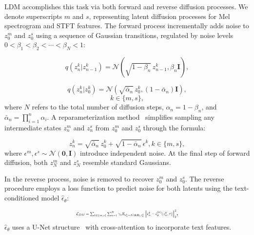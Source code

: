 \documentclass{IEEEtran}
\begin{document}
LDM accomplishes this task via both forward and reverse diffusion processes. We denote superscripts $m$ and $s$, representing latent diffusion processes for Mel spectrogram and STFT features. The forward process incrementally adds noise to $z^{m}_{0}$ and $z^{s}_{0}$ using a sequence of Gaussian transitions, regulated by noise levels $0 < \beta_{1} < \beta_{2} < \cdots < \beta_{N} < 1$:

\begin{equation}
q(z^{k}_{n} | z^{k}_{n-1}) = \mathcal{N}\left(\sqrt{1-\beta_{n}} \, z^{k}_{n-1}, \beta_{n} \mathbf{I}\right),
\end{equation}
\vspace{-0.5em}

\begin{equation}
q(z^{k}_{n} | z^{k}_{0}) = \mathcal{N}\left(\sqrt{\bar{\alpha}_{n}} \, z^{k}_{0}, (1-\bar{\alpha}_{n}) \mathbf{I}\right),
\end{equation}
\vspace{-0.5em}
\[
k \in \{m,s\},
\]
where \( N \) refers to the total number of diffusion steps, \( \alpha_{n} = 1 - \beta_{n} \), and \( \bar{\alpha}_{n} = \prod_{i=1}^{n} \alpha_{i} \). A reparameterization method~\cite{song2020denoising} simplifies sampling any intermediate states \( z^{m}_{n} \) and \( z^{s}_{n} \) from \( z^{m}_{0} \) and \( z^{s}_{0} \) through the formula:

\begin{equation}
z^{k}_{n} = \sqrt{\bar{\alpha}_{n}} \, z^{k}_{0} + \sqrt{1 - \bar{\alpha}_{n}} \, \epsilon^{k}, k \in \{m,s\},
\end{equation}
where \( \epsilon^{m}, \epsilon^{s} \sim \mathcal{N}(\mathbf{0}, \mathbf{I}) \) introduce independent noise. At the final step of forward diffusion, both \( z^{m}_{N} \) and \( z^{s}_{N} \) resemble standard Gaussians.

In the reverse process, noise is removed to recover \( z^{m}_{0} \) and \( z^{s}_{0} \). The reverse procedure employs a loss function to predict noise for both latents using the text-conditioned model \( \hat{\epsilon}_{\theta} \):

\vspace{-0.5em}
\begin{equation}
\resizebox{0.43\textwidth}{!}{$\mathcal{L}_{DM} = \sum_{k \in \{m,s\}} \sum_{n=1}^{N} \gamma_{n} \mathbb{E}_{\epsilon^{k}_{n} \sim \mathcal{N}(\mathbf{0}, \mathbf{I}), z^{k}_{0}} \left\| \epsilon^{k}_{n} - \hat{\epsilon}_{\theta}^{(n)}(z^{k}_{n}, \tau) \right\|_{2}^{2}$},
\end{equation}
$\hat{\epsilon}_{\theta}$ uses a U-Net structure~\cite{ronneberger2015u} with cross-attention to incorporate text features.
\end{document}
